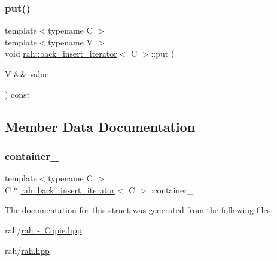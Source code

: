 \subsubsection{\texorpdfstring{put()}{put()}\hspace{0.1cm}{\footnotesize\ttfamily [2/2]}}
{\footnotesize\ttfamily template$<$typename C $>$ \\
template$<$typename V $>$ \\
void \mbox{\hyperlink{structrah_1_1back__insert__iterator}{rah\+::back\+\_\+insert\+\_\+iterator}}$<$ C $>$\+::put (\begin{DoxyParamCaption}\item[{V \&\&}]{value }\end{DoxyParamCaption}) const\hspace{0.3cm}{\ttfamily [inline]}}



\subsection{Member Data Documentation}
\mbox{\label{structrah_1_1back__insert__iterator_ad60a5db0dd4ae59777b739c5a581f635}} 
\subsubsection{\texorpdfstring{container\_}{container\_}}
{\footnotesize\ttfamily template$<$typename C $>$ \\
C $\ast$ \mbox{\hyperlink{structrah_1_1back__insert__iterator}{rah\+::back\+\_\+insert\+\_\+iterator}}$<$ C $>$\+::container\+\_\+}



The documentation for this struct was generated from the following files\+:\begin{DoxyCompactItemize}
\item 
rah/\mbox{\hyperlink{rah_01-_01_copie_8hpp}{rah -\/ Copie.\+hpp}}\item 
rah/\mbox{\hyperlink{rah_8hpp}{rah.\+hpp}}\end{DoxyCompactItemize}
